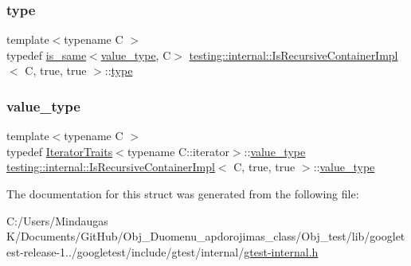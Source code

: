 \subsubsection{\texorpdfstring{type}{type}}
{\footnotesize\ttfamily template$<$typename C $>$ \\
typedef \mbox{\hyperlink{structtesting_1_1internal_1_1is__same}{is\+\_\+same}}$<$\mbox{\hyperlink{structtesting_1_1internal_1_1_is_recursive_container_impl_3_01_c_00_01true_00_01true_01_4_a8bbf5f5dec769e84b6f5a2e1fdb503e8}{value\+\_\+type}}, C$>$ \mbox{\hyperlink{structtesting_1_1internal_1_1_is_recursive_container_impl}{testing\+::internal\+::\+Is\+Recursive\+Container\+Impl}}$<$ C, true, true $>$\+::\mbox{\hyperlink{structtesting_1_1internal_1_1_is_recursive_container_impl_3_01_c_00_01true_00_01true_01_4_a6bf4fa07dd1c22c5d0ca4ed99c546e9c}{type}}}

\mbox{\label{structtesting_1_1internal_1_1_is_recursive_container_impl_3_01_c_00_01true_00_01true_01_4_a8bbf5f5dec769e84b6f5a2e1fdb503e8}} 
\subsubsection{\texorpdfstring{value\_type}{value\_type}}
{\footnotesize\ttfamily template$<$typename C $>$ \\
typedef \mbox{\hyperlink{structtesting_1_1internal_1_1_iterator_traits}{Iterator\+Traits}}$<$typename C\+::iterator$>$\+::\mbox{\hyperlink{structtesting_1_1internal_1_1_is_recursive_container_impl_3_01_c_00_01true_00_01true_01_4_a8bbf5f5dec769e84b6f5a2e1fdb503e8}{value\+\_\+type}} \mbox{\hyperlink{structtesting_1_1internal_1_1_is_recursive_container_impl}{testing\+::internal\+::\+Is\+Recursive\+Container\+Impl}}$<$ C, true, true $>$\+::\mbox{\hyperlink{structtesting_1_1internal_1_1_is_recursive_container_impl_3_01_c_00_01true_00_01true_01_4_a8bbf5f5dec769e84b6f5a2e1fdb503e8}{value\+\_\+type}}}



The documentation for this struct was generated from the following file\+:\begin{DoxyCompactItemize}
\item 
C\+:/\+Users/\+Mindaugas K/\+Documents/\+Git\+Hub/\+Obj\+\_\+\+Duomenu\+\_\+apdorojimas\+\_\+class/\+Obj\+\_\+test/lib/googletest-\/release-\/1../googletest/include/gtest/internal/\mbox{\hyperlink{_obj__test_2lib_2googletest-release-1_88_81_2googletest_2include_2gtest_2internal_2gtest-internal_8h}{gtest-\/internal.\+h}}\end{DoxyCompactItemize}
